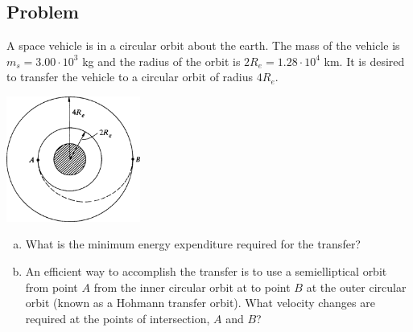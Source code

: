 \documentclass[solutions]{esg8012pset}
\begin{document}
\subsection{Problem}
  A space vehicle is in a circular orbit about the earth. The mass of the vehicle is $m_s = 3.00 \cdot 10^3$ kg and the radius of the orbit is $2R_e = 1.28 \cdot 10^4$ km. It is desired to transfer the vehicle to a circular orbit of radius $4R_e$.
  \begin{center}\includegraphics[width=0.33\textwidth]{ps10_2}\end{center}
  \begin{enumerate}[(a)]
    \item What is the minimum energy expenditure required for the transfer?
    \item An efficient way to accomplish the transfer is to use a semielliptical orbit from point $A$ from the inner circular orbit at to point $B$ at the outer circular orbit (known as a Hohmann transfer orbit). What velocity changes are required at the points of intersection, $A$ and $B$?
  \end{enumerate}
\end{document}

